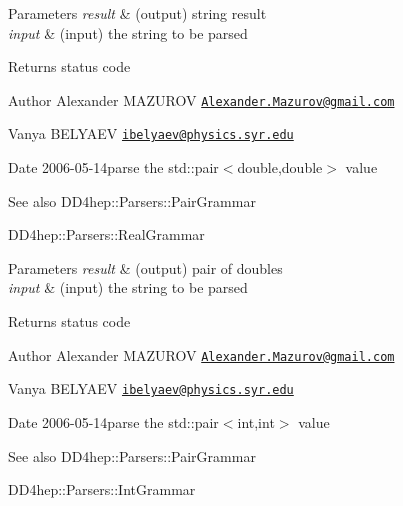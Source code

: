 \begin{DoxyParams}{Parameters}
{\em result} & (output) string result \\
\hline
{\em input} & (input) the string to be parsed \\
\hline
\end{DoxyParams}
\begin{DoxyReturn}{Returns}
status code
\end{DoxyReturn}
\begin{DoxyAuthor}{Author}
Alexander M\+A\+Z\+U\+R\+OV \href{mailto:Alexander.Mazurov@gmail.com}{\tt Alexander.\+Mazurov@gmail.\+com} 

Vanya B\+E\+L\+Y\+A\+EV \href{mailto:ibelyaev@physics.syr.edu}{\tt ibelyaev@physics.\+syr.\+edu} 
\end{DoxyAuthor}
\begin{DoxyDate}{Date}
2006-\/05-\/14parse the {\ttfamily std\+::pair$<$double,double$>$} value 
\end{DoxyDate}
\begin{DoxySeeAlso}{See also}
D\+D4hep\+::\+Parsers\+::\+Pair\+Grammar 

D\+D4hep\+::\+Parsers\+::\+Real\+Grammar 
\end{DoxySeeAlso}

\begin{DoxyParams}{Parameters}
{\em result} & (output) pair of doubles \\
\hline
{\em input} & (input) the string to be parsed \\
\hline
\end{DoxyParams}
\begin{DoxyReturn}{Returns}
status code
\end{DoxyReturn}
\begin{DoxyAuthor}{Author}
Alexander M\+A\+Z\+U\+R\+OV \href{mailto:Alexander.Mazurov@gmail.com}{\tt Alexander.\+Mazurov@gmail.\+com} 

Vanya B\+E\+L\+Y\+A\+EV \href{mailto:ibelyaev@physics.syr.edu}{\tt ibelyaev@physics.\+syr.\+edu} 
\end{DoxyAuthor}
\begin{DoxyDate}{Date}
2006-\/05-\/14parse the {\ttfamily std\+::pair$<$int,int$>$} value
\end{DoxyDate}
\begin{DoxySeeAlso}{See also}
D\+D4hep\+::\+Parsers\+::\+Pair\+Grammar 

D\+D4hep\+::\+Parsers\+::\+Int\+Grammar 
\end{DoxySeeAlso}

